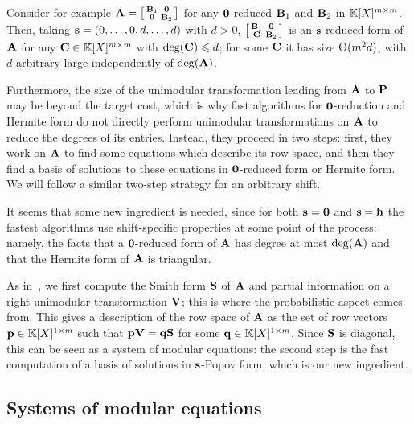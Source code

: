 \documentclass[preprint]{sig-alternate-05-2015}
\begin{document}
Consider for example $\mat{A} = \left[\begin{smallmatrix} \mat{B}_1 & \mat{0}
  \\ \mat{0} & \mat{B}_2 \end{smallmatrix}\right]$ for any $\unishift$-reduced
$\mat{B}_1$ and $\mat{B}_2$ in $\polMatSpace[\rdim]$. Then, taking $\shifts =
(0,\ldots,0,d,\ldots,d)$ with $d > 0$, $\left[\begin{smallmatrix} \mat{B}_1 &
    \mat{0} \\ \mat{C} & \mat{B}_2
\end{smallmatrix}\right]$ is an $\shifts$-reduced form of $\mat{A}$ for any
$\mat{C} \in \polMatSpace[\rdim]$ with $\deg(\mat{C}) \le d$; for some
$\mat{C}$ it has size $\Theta(\rdim^2 d)$, with $d$ arbitrary large
independently of $\deg(\mat{A})$.

Furthermore, the size of the unimodular transformation leading from $\mat{A}$
to $\popov$ may be beyond the target cost, which is why fast algorithms for
$\unishift$-reduction and Hermite form do not directly perform unimodular
transformations on $\mat{A}$ to reduce the degrees of its entries. Instead,
they proceed in two steps: first, they work on $\mat{A}$ to find some equations
which describe its row space, and then they find a basis of solutions to these
equations in $\unishift$-reduced form or Hermite form. We will follow a similar
two-step strategy for an arbitrary shift.

It seems that some new ingredient is needed, since for both $\shifts=\unishift$
and $\shifts=\shifts[h]$ the fastest algorithms use shift-specific properties
at some point of the process: namely, the facts that a $\unishift$-reduced form
of $\mat{A}$ has degree at most $\deg(\mat{A})$ and that the Hermite form of
$\mat{A}$ is triangular.

As in~\cite{GupSto11}, we first compute the Smith form $\smith$ of $\mat{A}$
and partial information on a right unimodular transformation $\mat{V}$; this is
where the probabilistic aspect comes from. This gives a description of the row
space of $\mat{A}$ as the set of row vectors $\row{p} \in
\polMatSpace[1][\rdim]$ such that $\row{p} \mat{V} = \row{q} \smith$ for some
$\row{q}\in \polMatSpace[1][\rdim]$. Since $\smith$ is diagonal, this can be
seen as a system of modular equations: the second step is the fast computation
of a basis of solutions in $\shifts$-Popov form, which is our new ingredient.

\subsection{Systems of modular equations}
\label{subsec:modsys}
\end{document}
